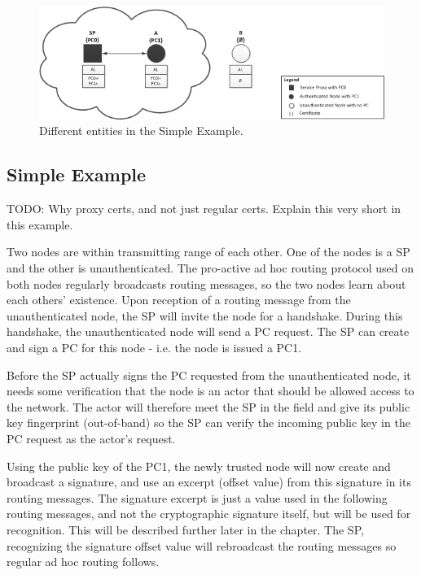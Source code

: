 \begin{figure}[h]
	\centering
  	\includegraphics{images/simple_example_entities.png}
  	\caption{Different entities in the Simple Example.}
	\label{fig:simple_example_entities}
\end{figure}

\subsection{Simple Example}
TODO: Why proxy certs, and not just regular certs. Explain this very short in
this example.

Two nodes are within transmitting range of each other. One of the
nodes is a \ac{SP} and the other is unauthenticated. The pro-active ad hoc
routing protocol used on both nodes regularly broadcasts routing messages, so
the two nodes learn about each others' existence. Upon reception of a routing
message from the unauthenticated node, the \ac{SP} will invite the node for a
handshake. During this handshake, the unauthenticated node will send a \ac{PC}
request. The \ac{SP} can create and sign a \ac{PC} for this node - i.e. the node
is issued a \ac{PC1}.

Before the \ac{SP} actually signs the \ac{PC} requested from the unauthenticated
node, it needs some verification that the node is an actor that should be
allowed access to the network. The actor will therefore meet the \ac{SP} in the
field and give its public key fingerprint (out-of-band) so the \ac{SP} can
verify the incoming public key in the \ac{PC} request as the actor's request.

Using the public key of the \ac{PC1}, the newly trusted node will now create and 
broadcast a signature, and use an excerpt (offset value) from this signature
in its routing messages. The signature excerpt is just a value used in the
following routing messages, and not the cryptographic signature itself, but
will be used for recognition. This will be described further later in the
chapter. The \ac{SP}, recognizing the signature offset value will rebroadcast
the routing messages so regular ad hoc routing follows.

